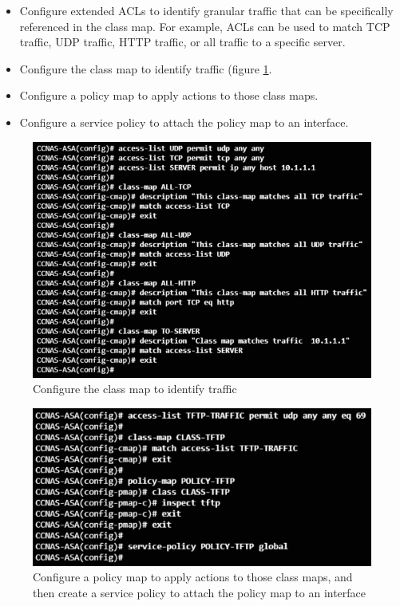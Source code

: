 \begin{itemize}
\item Configure extended ACLs to identify granular traffic that can be specifically referenced in the class map. For example, ACLs can be used to match TCP traffic, UDP traffic, HTTP traffic, or all traffic to a specific server.

\item Configure the class map to identify traffic (figure \ref{classmap}.

\item Configure a policy map to apply actions to those class maps.

\item Configure a service policy to attach the policy map to an interface.
\end{itemize}

\begin{figure}[hbtp]
\caption{Configure the class map to identify traffic}\label{classmap}
\centering
\includegraphics[scale=0.7]{pictures/classmap.PNG}
\end{figure}

\begin{figure}[hbtp]
\caption{Configure a policy map to apply actions to those class maps, and then create a service policy to attach the policy map to an interface}\label{MPFimplementation}
\centering
\includegraphics[scale=0.7]{pictures/MPFimplementation.PNG}
\end{figure}

